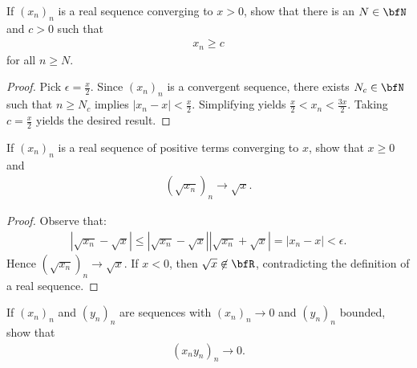 \documentclass[10pt,twoside,openany]{memoir}
\begin{document}
    \begin{exercise}
        If $(x_n)_n$ is a real sequence converging to $x>0$, show that there is an $N \in \bfN$ and $c>0$ such that
            \begin{equation*}
            \begin{split}
                x_n \geq c
            \end{split}
            \end{equation*}
        for all $n \geq N$.
    \end{exercise}
        \begin{proof}
            Pick $\epsilon = \frac{x}{2}$. Since $(x_n)_n$ is a convergent sequence, there exists $N_c \in \bfN$ such that $n \geq N_c$ implies $|x_n - x| < \frac{x}{2}$. Simplifying yields $\frac{x}{2} < x_n < \frac{3x}{2}$. Taking $c = \frac{x}{2}$ yields the desired result.
        \end{proof}
    \begin{exercise}
        If $(x_n)_n$ is a real sequence of positive terms converging to $x$, show that $x \geq 0$ and
            \begin{equation*}
            \begin{split}
                (\sqrt{x_n})_n \rightarrow \sqrt{x}.
            \end{split}
            \end{equation*}
        
            \begin{proof}
                Observe that:
                    \begin{equation*}
                    \begin{split}
                        \left|\sqrt{x_n} - \sqrt{x}\right| \leq \left|\sqrt{x_n}-\sqrt{x}\right|\left|\sqrt{x_n} + \sqrt{x}\right| = \left|x_n - x\right| < \epsilon.
                    \end{split}
                    \end{equation*}
                Hence $(\sqrt{x_n})_n \rightarrow \sqrt{x}$. If $x < 0$, then $\sqrt{x} \not\in \bfR$, contradicting the definition of a real sequence.
            \end{proof}
    \end{exercise}
    \begin{exercise}
        If $(x_n)_n$ and $(y_n)_n$ are sequences with $(x_n)_n \rightarrow 0$ and $(y_n)_n$ bounded, show that
            \begin{equation*}
            \begin{split}
                (x_n y_n)_n \rightarrow 0.
            \end{split}
            \end{equation*}
    \end{exercise}
\end{document}
